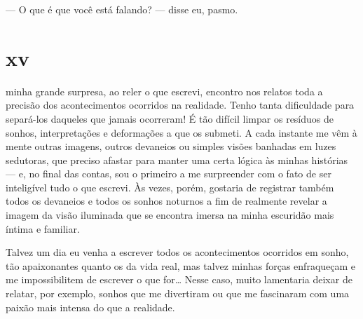 
--- O que é que você está falando? --- disse eu, pasmo.




\section{xv}

 minha grande surpresa, ao reler o que escrevi, encontro nos relatos
toda a precisão dos acontecimentos ocorridos na realidade. Tenho tanta
dificuldade para separá-los daqueles que jamais ocorreram! É tão difícil
limpar os resíduos de sonhos, interpretações e deformações a que os
submeti. A cada instante me vêm à mente outras imagens, outros devaneios
ou simples visões banhadas em luzes sedutoras, que preciso afastar para
manter uma certa lógica às minhas histórias --- e, no final das contas,
sou o primeiro a me surpreender com o fato de ser inteligível tudo o que
escrevi. Às vezes, porém, gostaria de registrar também todos os
devaneios e todos os sonhos noturnos a fim de realmente revelar a imagem
da visão iluminada que se encontra imersa na minha escuridão mais íntima
e familiar.

Talvez um dia eu venha a escrever todos os acontecimentos ocorridos em
sonho, tão apaixonantes quanto os da vida real, mas talvez minhas forças
enfraqueçam e me impossibilitem de escrever o que for\ldots{} Nesse
caso, muito lamentaria deixar de relatar, por exemplo, sonhos que me
divertiram ou que me fascinaram com uma paixão mais intensa do que a
realidade.

